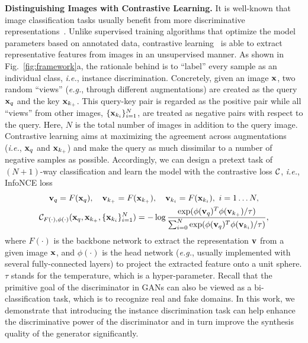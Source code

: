 \documentclass{article}
\begin{document}
\textbf{Distinguishing Images with Contrastive Learning.}
It is well-known that image classification tasks usually benefit from more discriminative representations~\cite{deng2009imagenet}.
Unlike supervised training algorithms that optimize the model parameters based on annotated data, contrastive learning~\cite{wu2018unsupervised, he2019momentum, chen2020simple, henaff2020data, bachman2019learning} is able to extract representative features from images in an unsupervised manner.
As shown in Fig.~\ref{fig:framework}a, the rationale behind is to ``label'' every sample as an individual class, \textit{i.e.}, instance discrimination.
Concretely, given an image ${\rm\bf x}$, two random ``views'' (\textit{e.g.}, through different augmentations) are created as the query ${\rm\bf x}_q$ and the key ${\rm\bf x}_{k_+}$.
This query-key pair is regarded as the positive pair while all ``views'' from other images, $\{{\rm\bf x}_{k_i}\}_{i=1}^{N}$, are treated as negative pairs with respect to the query.
Here, $N$ is the total number of images in addition to the query image.
Contrastive learning aims at maximizing the agreement across augmentations (\textit{i.e.}, ${\rm\bf x}_q$ and ${\rm\bf x}_{k_+}$) and make the query as much dissimilar to a number of negative samples as possible.
Accordingly, we can design a pretext task of $(N+1)$-way classification and learn the model with the contrastive loss ${\mathcal{C}}$, \textit{i.e.}, InfoNCE loss~\cite{oord2018representation}
\begin{gather}
    {\rm\bf v}_q = F({\rm\bf x}_q), \quad {\rm\bf v}_{k_+} = F({\rm\bf x}_{k_+}), \quad {\rm\bf v}_{k_i} = F({\rm\bf x}_{k_i}),\ i = 1 \dots N, \label{eqd:representation} \\
    {\mathcal{C}}_{F(\cdot),\phi(\cdot)}({\rm\bf x}_q, {\rm\bf x}_{k_+}, \{{\rm\bf x}_{k_i}\}_{i=1}^{N}) = -\log \frac{\exp(\phi({\rm\bf v}_q)^T\phi({\rm\bf v}_{k_+}) / \tau)}{\sum_{i=0}^{N}\exp(\phi({\rm\bf v}_q)^T\phi({\rm\bf v}_{k_i}) / \tau)}, \label{eqa:cl}
\end{gather}
where $F(\cdot)$ is the backbone network to extract the representation ${\rm\bf v}$ from a given image ${\rm\bf x}$, and $\phi(\cdot)$ is the head network (\textit{e.g.}, usually implemented with several fully-connected layers) to project the extracted feature onto a unit sphere.
$\tau$ stands for the temperature, which is a hyper-parameter.
Recall that the primitive goal of the discriminator in GANs can also be viewed as a bi-classification task, which is to recognize real and fake domains.
In this work, we demonstrate that introducing the instance discrimination task can help enhance the discriminative power of the discriminator and in turn improve the synthesis quality of the generator significantly.
\end{document}
